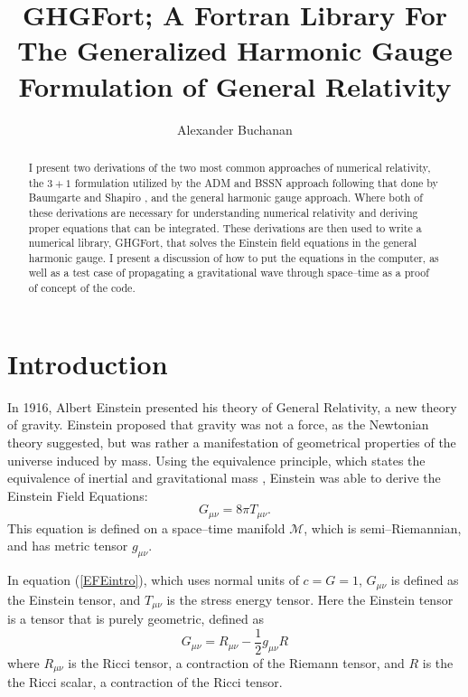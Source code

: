 \documentclass[11pt]{article}
\title{GHGFort; A Fortran Library For The Generalized Harmonic Gauge Formulation of General Relativity}
\author{Alexander Buchanan}
\date{}
\numberwithin{equation}{section}
\begin{document}
\maketitle

\begin{abstract}
    I present two derivations of the two most common approaches of numerical relativity, the $3+1$ formulation utilized by the ADM and BSSN approach following that done by Baumgarte and Shapiro \cite{baumgarte_shapiro_2010}, and the general harmonic gauge approach. Where both of these derivations are necessary for understanding numerical relativity and deriving proper equations that can be integrated. These derivations are then used to write a numerical library, GHGFort, that solves the Einstein field equations in the general harmonic gauge. I present a discussion of how to put the equations in the computer, as well as a test case of propagating a gravitational wave through space--time as a proof of concept of the code.  
\end{abstract}

\tableofcontents

\section{Introduction}
In 1916, Albert Einstein presented his theory of General Relativity, a new theory of gravity. Einstein proposed that gravity was not a force, as the Newtonian theory suggested, but was rather a manifestation of geometrical properties of the universe induced by mass. Using the equivalence principle, which states the equivalence of inertial and gravitational mass \cite{schutz}, Einstein was able to derive the Einstein Field Equations:
\begin{equation}\label{EFEintro}
G_{\mu\nu} = 8\pi T_{\mu\nu}.
\end{equation}
This equation is defined on a space--time manifold $\mathcal{M}$, which is semi--Riemannian, and has metric tensor $g_{\mu\nu}$. 

In equation (\ref{EFEintro}), which uses normal units of $c=G=1$, $G_{\mu\nu}$ is defined as the Einstein tensor,
and $T_{\mu\nu}$ is the stress energy tensor.
Here the Einstein tensor is a tensor that is purely geometric, defined as
\begin{equation}
    G_{\mu\nu} = R_{\mu\nu} - \frac12g_{\mu\nu}R
\end{equation}
where $R_{\mu\nu}$ is the Ricci tensor, a contraction of the Riemann tensor, and $R$ is the the Ricci scalar, a contraction of the Ricci tensor. 
\end{document}
